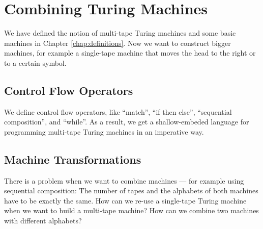 \chapter{Combining Turing Machines}
\label{chap:combining}

We have defined the notion of multi-tape Turing machines and some basic machines in Chapter \ref{chap:definitions}.
Now we want to construct bigger machines, for example a single-tape machine that moves the head to the right or to a certain symbol.

\section{Control Flow Operators}
\label{sec:control}

We define control flow operators, like ``match'', ``if then else'', ``sequential composition'', and ``while''.
As a result, we get a shallow-embeded language for programming multi-tape Turing machines in an imperative way.


\section{Machine Transformations}
\label{sec:transformations}

There is a problem when we want to combine machines --- for example using sequential composition:
The number of tapes and the alphabets of both machines have to be exactly the same.
How can we re-use a single-tape Turing machine when we want to build a multi-tape machine?
How can we combine two machines with different alphabets?


